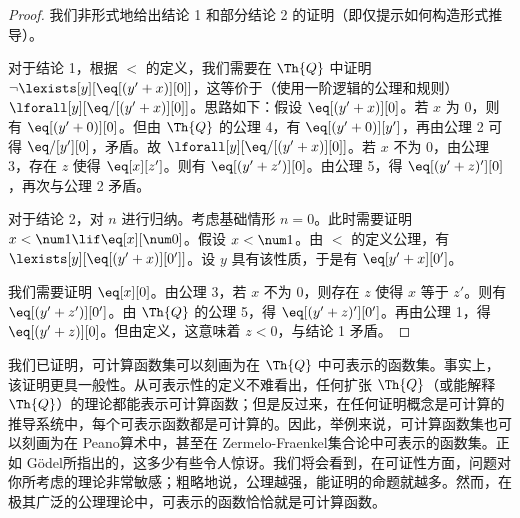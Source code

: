 \documentclass[../../../include/open-logic-section]{subfiles}
\begin{document}
\begin{proof}
我们非形式地给出结论 1 和部分结论 2 的证明（即仅提示如何构造形式推导）。

对于结论 1，根据 $<$ 的定义，我们需要在 $\Th{Q}$ 中证明 $\lnot
\lexists[y][\eq[(y'+x)][0]]$，这等价于（使用一阶逻辑的公理和规则）$\lforall[y][\eq/[(y' +
    x)][0]]$。思路如下：假设 $\eq[(y'+x)][0]$。若 $x$ 为 $0$，则有 $\eq[(y' + 0)][0]$。但由 $\Th{Q}$ 的公理 4，有 $\eq[(y' + 0)][y']$，再由公理 2 可得 $\eq/[y'][0]$，矛盾。故 $\lforall[y][\eq/[(y' +x)][0]]$。若 $x$ 不为 $0$，由公理 3，存在 $z$ 使得 $\eq[x][z']$。则有 $\eq[(y' + z')][0]$。由公理 5，得 $\eq[(y' + z)'][0]$，再次与公理 2 矛盾。

对于结论 2，对 $n$ 进行归纳。考虑基础情形 $n = 0$。此时需要证明 $x < \num 1 \lif \eq[x][\num
  0]$。假设 $x < \num 1$。由 $<$ 的定义公理，有 $\lexists[y][\eq[(y'+x)][0']]$。设 $y$ 具有该性质，于是有 $\eq[y'+x][0']$。

我们需要证明 $\eq[x][0]$。由公理 3，若 $x$ 不为 0，则存在 $z$ 使得 $x$ 等于 $z'$。则有 $\eq[(y' + z')][0']$。由 $\Th{Q}$ 的公理 5，得 $\eq[(y'+z)'][0']$。再由公理 1，得 $\eq[(y' +
    z)][0]$。但由定义，这意味着 $z < 0$，与结论 1 矛盾。
\end{proof}

\begin{explain}
我们已证明，可计算函数集可以刻画为在 $\Th{Q}$ 中可表示的函数集。事实上，该证明更具一般性。从可表示性的定义不难看出，任何扩张 $\Th{Q}$（或能解释 $\Th{Q}$）的理论都能表示可计算函数；但是反过来，在任何证明概念是可计算的推导系统中，每个可表示函数都是可计算的。因此，举例来说，可计算函数集也可以刻画为在 Peano算术中，甚至在 Zermelo-Fraenkel集合论中可表示的函数集。正如 Gödel所指出的，这多少有些令人惊讶。我们将会看到，在可证性方面，问题对你所考虑的理论非常敏感；粗略地说，公理越强，能证明的命题就越多。然而，在极其广泛的公理理论中，可表示的函数恰恰就是可计算函数。
\end{explain}
\end{document}
